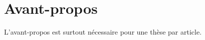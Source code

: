 \chapter*{Avant-propos}         %

L'avant-propos est surtout nécessaire pour une thèse par article.
